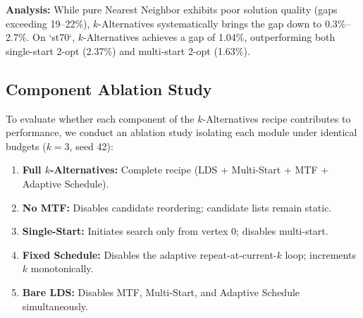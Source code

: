 \documentclass[11pt,a4paper]{article}
\begin{document}
\begin{table}[htbp]
\centering
\small
\caption{\textbf{Controlled Comparison Across Classical Baselines on TSPLIB Instances.}}
\label{tab:baselines}
\end{table}

\textbf{Analysis:} While pure Nearest Neighbor exhibits poor solution quality (gaps exceeding 19--22\%), $k$-Alternatives systematically brings the gap down to 0.3\%--2.7\%. On `st70`, $k$-Alternatives achieves a gap of 1.04\%, outperforming both single-start 2-opt (2.37\%) and multi-start 2-opt (1.63\%).

\subsection{Component Ablation Study}
To evaluate whether each component of the $k$-Alternatives recipe contributes to performance, we conduct an ablation study isolating each module under identical budgets ($k=3$, seed 42):
\begin{enumerate}
    \item \textbf{Full $k$-Alternatives:} Complete recipe (LDS + Multi-Start + MTF + Adaptive Schedule).
    \item \textbf{No MTF:} Disables candidate reordering; candidate lists remain static.
    \item \textbf{Single-Start:} Initiates search only from vertex 0; disables multi-start.
    \item \textbf{Fixed Schedule:} Disables the adaptive repeat-at-current-$k$ loop; increments $k$ monotonically.
    \item \textbf{Bare LDS:} Disables MTF, Multi-Start, and Adaptive Schedule simultaneously.
\end{enumerate}
\end{document}
